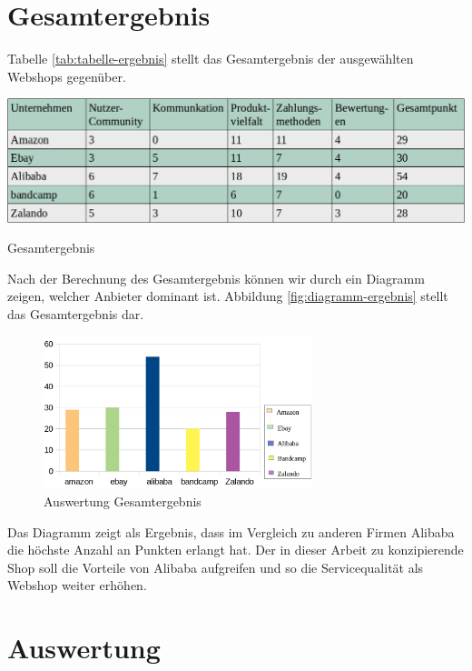 \newpage


\section{Gesamtergebnis}

Tabelle \vref{tab:tabelle-ergebnis} stellt das Gesamtergebnis der ausgewählten Webshops gegenüber.

\begin{table}[htbp]
	\centering
	\includegraphics[width=1\textwidth]{bilder/tabelle-ergebnis.png}
	\caption{Gesamtergebnis}
	\label{tab:tabelle-ergebnis}
\end{table}

Nach der Berechnung des Gesamtergebnis können wir durch ein Diagramm zeigen, welcher Anbieter dominant ist. Abbildung \vref{fig:diagramm-ergebnis} stellt das Gesamtergebnis dar.

\begin{figure}[htbp]
	\centering
	\includegraphics[width=0.7\textwidth]{bilder/diagramm-ergebnis.png}
	\caption{Auswertung Gesamtergebnis}
	\label{fig:diagramm-ergebnis}
\end{figure}

Das Diagramm zeigt als Ergebnis, dass im Vergleich zu anderen Firmen Alibaba die höchste Anzahl an Punkten erlangt hat. Der in dieser Arbeit zu konzipierende Shop soll die Vorteile von Alibaba aufgreifen und so die Servicequalität als Webshop weiter erhöhen.


\section{Auswertung} 

